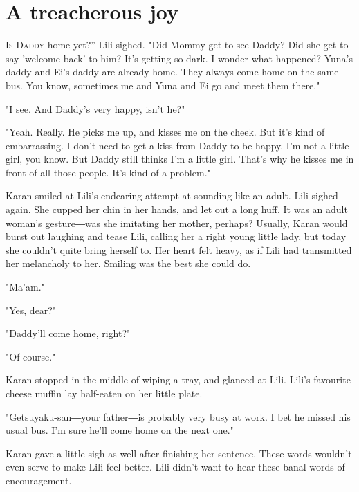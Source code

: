 
\chapter{A treacherous joy}


\lettrine[ante=``]{I}{s Daddy} home yet?'' Lili sighed. "Did Mommy get to see Daddy? Did she
get to say 'welcome back' to him? It's getting so dark. I wonder what
happened? Yuna's daddy and Ei's daddy are already home. They always come
home on the same bus. You know, sometimes me and Yuna and Ei go and meet
them there."

"I see. And Daddy's very happy, isn't he?"

"Yeah. Really. He picks me up, and kisses me on the cheek. But it's kind
of embarrassing. I don't need to get a kiss from Daddy to be happy. I'm
not a little girl, you know. But Daddy still thinks I'm a little girl.
That's why he kisses me in front of all those people. It's kind of a
problem."

Karan smiled at Lili's endearing attempt at sounding like an adult. Lili
sighed again. She cupped her chin in her hands, and let out a long huff.
It was an adult woman's gesture―was she imitating her mother, perhaps?
Usually, Karan would burst out laughing and tease Lili, calling her a
right young little lady, but today she couldn't quite bring herself to.
Her heart felt heavy, as if Lili had transmitted her melancholy to her.
Smiling was the best she could do.

"Ma'am."

"Yes, dear?"

"Daddy'll come home, right?"

"Of course."

Karan stopped in the middle of wiping a tray, and glanced at Lili.
Lili's favourite cheese muffin lay half-eaten on her little plate.

"Getsuyaku-san―your father―is probably very busy at work. I bet he
missed his usual bus. I'm sure he'll come home on the next one."

Karan gave a little sigh as well after finishing her sentence. These
words wouldn't even serve to make Lili feel better. Lili didn't want to
hear these banal words of encouragement.

